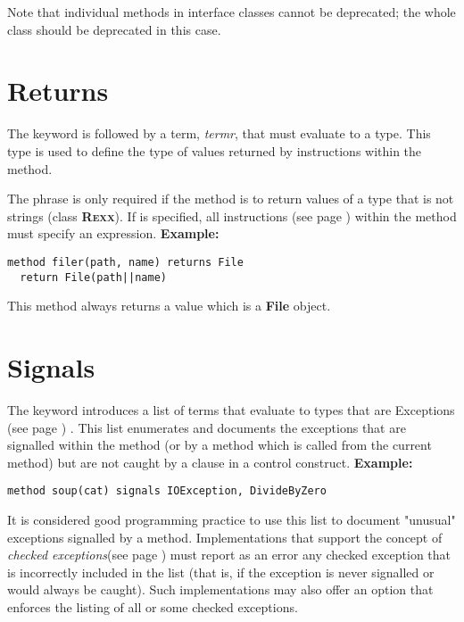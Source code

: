 Note that individual methods in interface classes cannot be
deprecated; the whole class should be deprecated in this case.
\section{Returns}
 
The  keyword is followed by a term, \emph{termr},
that must evaluate to a type.
This type is used to define the type of values returned by
 instructions within the method.
 
The  phrase is only required if the method is to return
values of a type that is not \nr{} strings (class \textbf{R\textsc{exx}}).
If  is specified, all
  instructions (see page \pageref{refreturn})  within the method must
specify an expression.
 \textbf{Example:}
\begin{lstlisting}
method filer(path, name) returns File
  return File(path||name)
\end{lstlisting}
This method always returns a value which is a \textbf{File} object.
\section{Signals}
 
The  keyword introduces a list of terms that evaluate to
types that are  Exceptions (see page \pageref{refexcep}) .
This list enumerates and documents the exceptions that are signalled
within the method (or by a method which is called from the current
method) but are not caught by a  clause in a control
construct.
 \textbf{Example:}
\begin{lstlisting}
method soup(cat) signals IOException, DivideByZero
\end{lstlisting}
 
It is considered good programming practice to use this list to document
"unusual" exceptions signalled by a method.
Implementations that support the concept of \emph{checked exceptions}(see page \pageref{refchecked}) must report as an error any checked exception that is
incorrectly included in the list (that is, if the exception is never
signalled or would always be caught).  Such implementations may also
offer an option that enforces the listing of all or some checked
exceptions.
